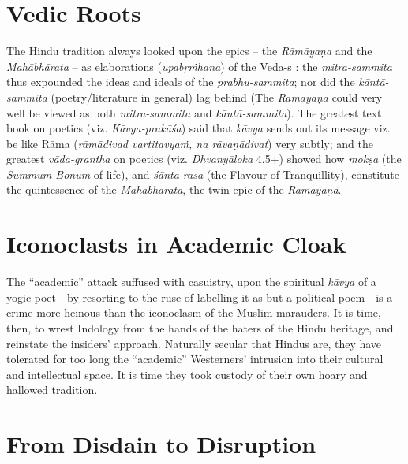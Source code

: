 \section*{Vedic Roots}

The Hindu tradition always looked upon the epics -- the {\sl Rāmāyaṇa} and the {\sl Mahābhārata} -- as elaborations ({\sl upabṛṁhaṇa}) of the Veda-s : the {\sl mitra-sammita} thus expounded the ideas and ideals  of the {\sl prabhu-sammita}; nor did the {\sl kāntā-sammita} (poetry/literature in general) lag behind (The {\sl Rāmāyaṇa} could very well be viewed as both {\sl mitra-sammita} and {\sl kāntā-sammita}). The greatest text book on poetics (viz. {\sl Kāvya-prakāśa}) said that {\sl kāvya} sends out its message viz. be like Rāma ({\sl rāmādivad vartitavyaṁ, na rāvaṇādivat}) very subtly; and the greatest {\sl vāda-grantha} on poetics (viz. {\sl Dhvanyāloka} 4.5+) showed how {\sl mokṣa} (the {\sl Summum Bonum} of life), and {\sl śānta-rasa} (the Flavour of Tranquillity), constitute the quintessence of the {\sl Mahābhārata}, the twin epic of the {\sl Rāmāyaṇa}.

\section*{Iconoclasts in Academic Cloak}

The “academic” attack suffused with casuistry, upon the spiritual {\sl kāvya} of a yogic poet - by resorting to the ruse of labelling it as but a political poem - is a crime more heinous than the iconoclasm of the Muslim marauders. It is time, then, to wrest Indology from the hands of the haters of the Hindu heritage, and reinstate the insiders’ approach. Naturally secular that Hindus are, they have  tolerated for too long the “academic” Westerners’ intrusion into their cultural and intellectual space. It is time they took custody of their own hoary and hallowed tradition. 

\section*{From Disdain to Disruption}

